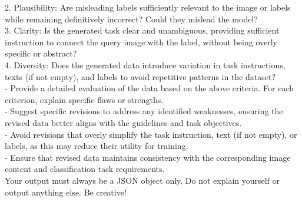 \begin{figure*}[p]
\begin{prompt}[title={Prompt: Synthesizing Classification Data}, label=prompt:cla]
  2. Plausibility: Are misleading labels sufficiently relevant to the image or labels while remaining definitively incorrect? Could they mislead the model?\\
  3. Clarity: Is the generated task clear and unambiguous, providing sufficient instruction to connect the query image with the label, without being overly specific or abstract?\\
  4. Diversity: Does the generated data introduce variation in task instructions, texts (if not empty), and labels to avoid repetitive patterns in the dataset?\\
- Provide a detailed evaluation of the data based on the above criteria. For each criterion, explain specific flaws or strengths.\\
- Suggest specific revisions to address any identified weaknesses, ensuring the revised data better aligns with the guidelines and task objectives.\\
- Avoid revisions that overly simplify the task instruction, text (if not empty), or labels, as this may reduce their utility for training.\\
- Ensure that revised data maintains consistency with the corresponding image content and classification task requirements.\\

Your output must always be a JSON object only. Do not explain yourself or output anything else. Be creative!
    
\end{prompt}
\end{figure*}



